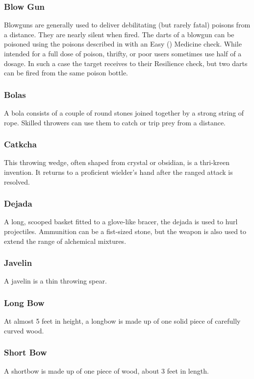 \begin{multicols}{2}

\subsubsection{Blow Gun}
\label{itmrng:blowgun}
Blowguns are generally used to deliver debilitating (but rarely fatal) poisons from a distance. They are nearly silent when fired. The darts of a
blowgun can be poisoned using the poisons described in  with an Easy (\difficulty) Medicine check. While intended for a full
dose of poison, thrifty, or poor users sometimes use half of a dosage. In such a case the target receives \boost\boost\boost to their Resilience
check, but two darts can be fired from the same poison bottle.

\subsubsection{Bolas}
\label{itmrng:bolas}
A bola consists of a couple of round stones joined together by a strong string of rope. Skilled throwers can use them to catch or trip prey from a distance.

\subsubsection{Catkcha}
\label{itmrng:catkcha}
This throwing wedge, often shaped from crystal or obsidian, is a thri-kreen invention. It returns to a proficient wielder’s hand after the ranged attack is resolved.

\subsubsection{Dejada}
\label{itmrng:dejada}
A long, scooped basket fitted to a glove-like bracer, the dejada is used to hurl projectiles. Ammunition can be a fist-sized stone, but the weapon is also used to extend the range of alchemical mixtures.

\subsubsection{Javelin}
\label{itmrng:javelin}
A javelin is a thin throwing spear.

\subsubsection{Long Bow}
\label{itmrng:longbow}
At almost 5 feet in height, a longbow is made up of one solid piece of carefully curved wood.

\subsubsection{Short Bow}
\label{itmrng:shortbow}
A shortbow is made up of one piece of wood, about 3 feet in length.

\end{multicols}
